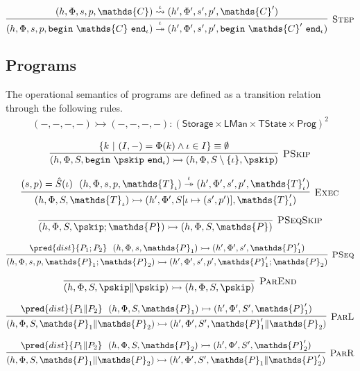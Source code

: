 \[
\infer[\textsc{Step}]
{
	(h, \Phi, s, p, \mathtt{begin}\ \mathds{C}\ \mathtt{end}_\iota)
	\overset{\iota}{\twoheadrightarrow}
	(h', \Phi', s', p', \mathtt{begin}\ \mathds{C}'\ \mathtt{end}_\iota)
}
{
	(h, \Phi, s, p, \mathds{C})
	\overset{\iota}{\rightsquigarrow}
	(h', \Phi', s', p', \mathds{C}')
}
\]

\subsection{Programs}

The operational semantics of programs are defined as a transition relation through the following rules.
\begin{gather*}
(-, -, -, -) \rightarrowtail (-, -, -, -) 
: (\mathsf{Storage} \times \mathsf{LMan} \times \mathsf{TState} \times \mathsf{Prog})^2
\end{gather*}

\[
\infer[\textsc{PSkip}]
{
	 (h, \Phi, S, \mathtt{begin}\ \pskip\ \mathtt{end}_\iota)
	\rightarrowtail
	(h, \Phi, S \setminus \{\iota\}, \pskip)
}
{
	\{ k\ |\ (I, -) = \Phi(k) \land \iota \in I \} \equiv \emptyset
}
\]

\[
\infer[\textsc{Exec}]
{
	 (h, \Phi, S, \mathds{T}_\iota)
	\rightarrowtail
	(h', \Phi', S[\iota \mapsto (s', p')], \mathds{T}_\iota')
}
{
	(s, p) = \hat{S}(\iota)\ \
	(h, \Phi, s, p, \mathds{T}_\iota)
	\overset{\iota}{\twoheadrightarrow}
	(h', \Phi', s', p', \mathds{T}_\iota')
}
\]

\[
\infer[\textsc{PSeqSkip}]
{
	 (h, \Phi, S, \pskip; \mathds{P})
	\rightarrowtail
	(h, \Phi, S, \mathds{P})
}
{}
\]

\[
\infer[\textsc{PSeq}]
{
	 (h, \Phi, s, p, \mathds{P}_1; \mathds{P}_2)
	\rightarrowtail
	(h', \Phi', s', p', \mathds{P}_1'; \mathds{P}_2)
}
{
	\pred{dist}{P_1 ; P_2}\ \
	 (h, \Phi, s, \mathds{P}_1)
	\rightarrowtail
	(h', \Phi', s', \mathds{P}_1')
}
\]

\[
\infer[\textsc{ParEnd}]
{
	 (h, \Phi, S, \pskip \| \pskip)
	\rightarrowtail
	(h, \Phi, S, \pskip)
}
{}
\]

\[
\infer[\textsc{ParL}]
{
	 (h, \Phi, S, \mathds{P}_1 \| \mathds{P}_2)
	\rightarrowtail
	(h', \Phi', S', \mathds{P}_1' \| \mathds{P}_2)
}
{
	\pred{dist}{P_1 \| P_2}\ \
	 (h, \Phi, S, \mathds{P}_1)
	\rightarrowtail
	(h', \Phi', S', \mathds{P}_1')
}
\]

\[
\infer[\textsc{ParR}]
{
	 (h, \Phi, S, \mathds{P}_1 \| \mathds{P}_2)
	\rightarrowtail
	(h', \Phi', S', \mathds{P}_1 \| \mathds{P}_2')
}
{
	\pred{dist}{P_1 \| P_2}\ \
	 (h, \Phi, S, \mathds{P}_2)
	\rightarrowtail
	(h', \Phi', S', \mathds{P}_2')
}
\]


